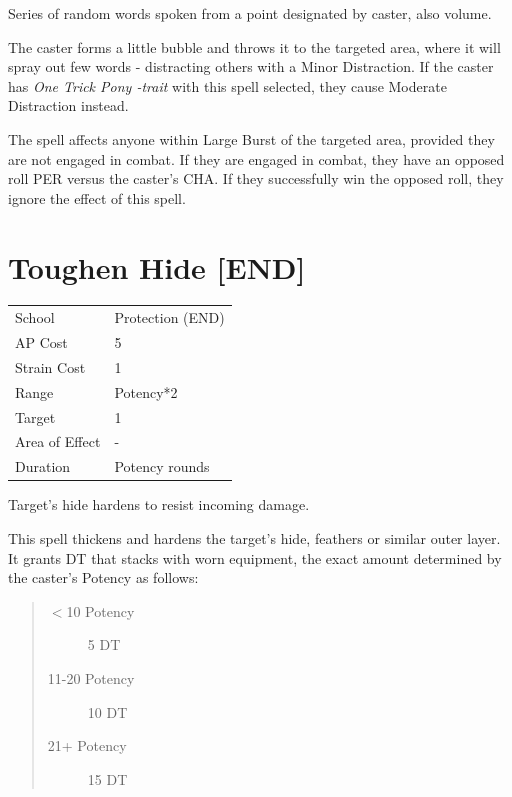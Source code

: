 \documentclass[11pt,a4paper,twocolumn]{book}
\begin{document}
\medskip

Series of random words spoken from a point designated by caster, also volume.

The caster forms a little bubble and throws it to the targeted area, where it will spray out few words - distracting others with a Minor Distraction. If the caster has \textit{One Trick Pony -trait} with this spell selected, they cause Moderate Distraction instead.

The spell affects anyone within Large Burst of the targeted area, provided they are not engaged in combat. If they are engaged in combat, they have an opposed roll PER versus the caster's CHA. If they successfully win the opposed roll, they ignore the effect of this spell.

\vfill


\section*{Toughen Hide [END]}
{
	\begin{tabu} to 75mm{| X[l,4] | X[l,7] |}
		\hline
		School 			& Protection (END) 				\\
        AP Cost	      	& 5 							\\
        Strain Cost     & 1 							\\
        Range     		& Potency*2 					\\
        Target      	& 1								\\
        Area of Effect  & - 	 						\\
        Duration     	& Potency rounds				\\ \hline
	\end{tabu}
		
}

\medskip

Target's hide hardens to resist incoming damage.

This spell thickens and hardens the target's hide, feathers or similar outer layer. It grants DT that stacks with worn equipment, the exact amount determined by the caster's Potency as follows:
\begin{quote}
  \begin{description}
    \item[$<$10 Potency] 	5 DT
    \item[11-20 Potency] 	10 DT
    \item[21+ Potency] 		15 DT
  \end{description}
\end{quote}
\end{document}
